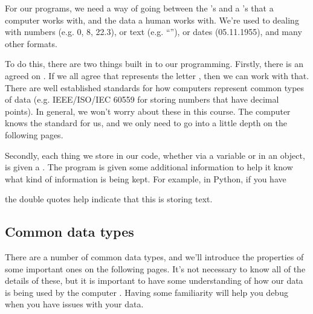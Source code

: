 \documentclass[letterpaper,10pt,british]{sphinxmanual}
\begin{document}
\sphinxAtStartPar
For our programs, we need a way of going between the ’s and a ’s that a computer works with, and the data a human works with. We’re used to dealing with numbers (e.g. 0, 8, 22.3), or text (e.g. “”), or dates (05.11.1955), and many other formats.

\sphinxAtStartPar
To do this, there are two things built in to our programming. Firstly, there is an agreed on . If we all agree that  represents the letter , then we can work with that. There are well established standards for how computers represent common types of data (e.g. IEEE/ISO/IEC 60559 for storing numbers that have decimal points). In general, we won’t worry about these in this course. The computer knows the standard for us, and we only need to go into a little depth on the following pages.

\sphinxAtStartPar
Secondly, each thing we store in our code, whether via a variable or in an object, is given a . The program is given some additional information to help it know what kind of information is being kept. For example, in Python, if you have

\begin{sphinxVerbatim}[commandchars=\\\{\}]
  
\end{sphinxVerbatim}

\sphinxAtStartPar
the double quotes  help indicate that this is storing text.


\subsection{Common data types}
\label{\detokenize{chapters/programming_fundamentals/data_types:common-data-types}}
\sphinxAtStartPar
There are a number of common data types, and we’ll introduce the properties of some important ones on the following pages. It’s not necessary to know all of the details of these, but it is important to have some understanding of how our data is being used by the computer . Having some familiarity will help you debug when you have issues with your data.
\end{document}
